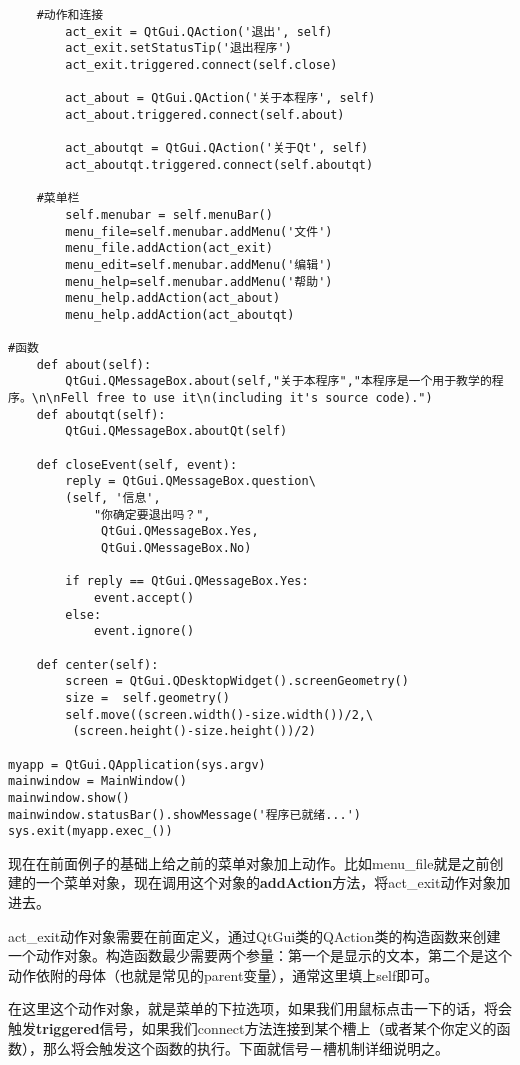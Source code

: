 \documentclass[12pt,oneside]{book}
\begin{document}
\begin{common-format}
\begin{Verbatim}
    #动作和连接
        act_exit = QtGui.QAction('退出', self)
        act_exit.setStatusTip('退出程序')
        act_exit.triggered.connect(self.close)

        act_about = QtGui.QAction('关于本程序', self)
        act_about.triggered.connect(self.about)

        act_aboutqt = QtGui.QAction('关于Qt', self)
        act_aboutqt.triggered.connect(self.aboutqt)

    #菜单栏
        self.menubar = self.menuBar()
        menu_file=self.menubar.addMenu('文件')
        menu_file.addAction(act_exit)
        menu_edit=self.menubar.addMenu('编辑')
        menu_help=self.menubar.addMenu('帮助')
        menu_help.addAction(act_about)
        menu_help.addAction(act_aboutqt)

#函数
    def about(self):
        QtGui.QMessageBox.about(self,"关于本程序","本程序是一个用于教学的程序。\n\nFell free to use it\n(including it's source code).")
    def aboutqt(self):
        QtGui.QMessageBox.aboutQt(self)

    def closeEvent(self, event):
        reply = QtGui.QMessageBox.question\
        (self, '信息',
            "你确定要退出吗？",
             QtGui.QMessageBox.Yes,
             QtGui.QMessageBox.No)

        if reply == QtGui.QMessageBox.Yes:
            event.accept()
        else:
            event.ignore()

    def center(self):
        screen = QtGui.QDesktopWidget().screenGeometry()
        size =  self.geometry()
        self.move((screen.width()-size.width())/2,\
         (screen.height()-size.height())/2)

myapp = QtGui.QApplication(sys.argv)
mainwindow = MainWindow()
mainwindow.show()
mainwindow.statusBar().showMessage('程序已就绪...')
sys.exit(myapp.exec_())
\end{Verbatim}
现在在前面例子的基础上给之前的菜单对象加上动作。比如menu\_{}file就是之前创建的一个菜单对象，现在调用这个对象的\textbf{addAction}方法，将act\_{}exit动作对象加进去。

act\_{}exit动作对象需要在前面定义，通过QtGui类的QAction类的构造函数来创建一个动作对象。构造函数最少需要两个参量：第一个是显示的文本，第二个是这个动作依附的母体（也就是常见的parent变量），通常这里填上self即可。

在这里这个动作对象，就是菜单的下拉选项，如果我们用鼠标点击一下的话，将会触发\textbf{triggered}信号，如果我们connect方法连接到某个槽上（或者某个你定义的函数），那么将会触发这个函数的执行。下面就信号－槽机制详细说明之。

\end{common-format}
\end{document}
